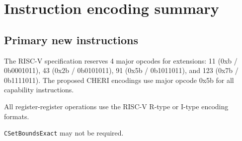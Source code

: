 {
\setlength{\parindent}{0cm}




\chapter{Instruction encoding summary}
\label{app:isaquick-riscv}

	\section{Primary new instructions}

		The RISC-V specification reserves 4 major opcodes for extensions: 11 (0xb / 0b0001011), 43 (0x2b / 0b0101011), 91 (0x5b / 0b1011011), and 123 (0x7b / 0b1111011).
		The proposed CHERI encodings use major opcode 0x5b for all capability instructions.

		All register-register operations use the RISC-V R-type or I-type encoding formats.

		\rvcheriheader









		\rvcheriheader











		\texttt{CSetBoundsExact} may not be required.

}
